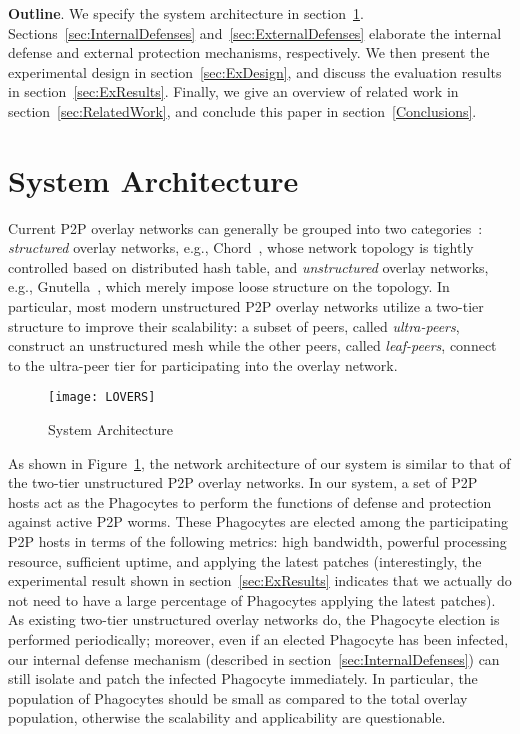 \documentclass[times,10pt,twocolumn]{article}
\begin{document}
\textbf{Outline}. We specify the system architecture in
section~\ref{sec:SystemArchitecture}.
Sections~\ref{sec:InternalDefenses} and~\ref{sec:ExternalDefenses}
elaborate the internal defense and external protection mechanisms,
respectively. We then present the experimental design in
section~\ref{sec:ExDesign}, and discuss the evaluation results in
section~\ref{sec:ExResults}. Finally, we give an overview of related
work in section~\ref{sec:RelatedWork}, and conclude this paper in
section~\ref{Conclusions}.




\section{System Architecture}
\label{sec:SystemArchitecture}


Current P2P overlay networks can generally be grouped into two
categories~\cite{lua04survey}: \emph{structured} overlay networks,
e.g., Chord~\cite{Chord:Stoica2001}, whose network topology is
tightly controlled based on distributed hash table, and
\emph{unstructured} overlay networks, e.g.,
Gnutella~\cite{gnutella:ultrapeers02}, which merely impose loose
structure on the topology. In particular, most modern unstructured
P2P overlay networks utilize a two-tier structure to improve their
scalability: a subset of peers, called \emph{ultra-peers}, construct
an unstructured mesh while the other peers, called
\emph{leaf-peers}, connect to the ultra-peer tier for participating
into the overlay network.


\begin{figure}[tbp]
\centering
\texttt{[image: LOVERS]}
\caption{System Architecture} \label{fig:LOVERS}
\end{figure}

As shown in Figure~\ref{fig:LOVERS}, the network architecture of our
system is similar to that of the two-tier unstructured P2P overlay
networks. In our system, a set of P2P hosts act as the Phagocytes to
perform the functions of defense and protection against active P2P
worms. These Phagocytes are elected among the participating P2P
hosts in terms of the following metrics: high bandwidth, powerful
processing resource, sufficient uptime, and applying the latest
patches (interestingly, the experimental result shown in
section~\ref{sec:ExResults} indicates that we actually do not need
to have a large percentage of Phagocytes applying the latest
patches). As existing two-tier unstructured overlay networks do, the
Phagocyte election is performed periodically; moreover, even if an
elected Phagocyte has been infected, our internal defense mechanism
(described in section~\ref{sec:InternalDefenses}) can still isolate
and patch the infected Phagocyte immediately. In particular, the
population of Phagocytes should be small as compared to the total
overlay population, otherwise the scalability and applicability are
questionable.
\end{document}
